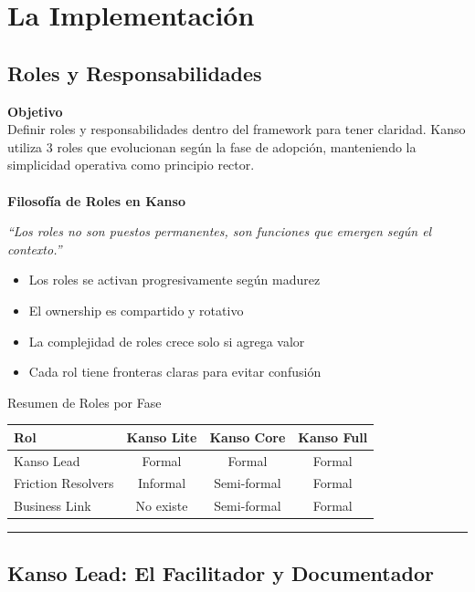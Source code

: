 \chapter{La Implementación}\label{chap:three}

\section{Roles y Responsabilidades}

\textbf{Objetivo}\\
Definir roles y responsabilidades dentro del framework para tener claridad. Kanso utiliza 3 roles que evolucionan según la fase de adopción, manteniendo la simplicidad operativa como principio rector.
\\
\\
\textbf{Filosofía de Roles en Kanso}

\textit{``Los roles no son puestos permanentes, son funciones que emergen según el contexto.''}

\begin{itemize}
    \item Los roles se activan progresivamente según madurez
    \item El ownership es compartido y rotativo
    \item La complejidad de roles crece solo si agrega valor
    \item Cada rol tiene fronteras claras para evitar confusión
\end{itemize}

Resumen de Roles por Fase

\begin{center}
\small
\begin{tabular}{|l|c|c|c|}
\hline
\textbf{Rol} & \textbf{Kanso Lite} & \textbf{Kanso Core} & \textbf{Kanso Full} \\ \hline
Kanso Lead & Formal & Formal & Formal \\ \hline
Friction Resolvers & Informal & Semi-formal & Formal \\ \hline
Business Link & No existe & Semi-formal & Formal \\ \hline
\end{tabular}
\end{center}

\hrule
\section{Kanso Lead: El Facilitador y Documentador}\label{sec:dedicacion}


